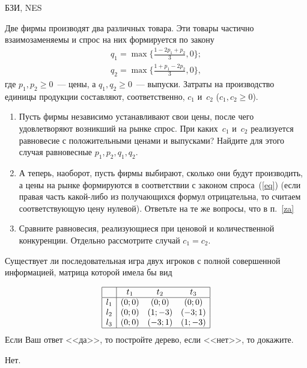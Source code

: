 \begin{problem}
\begin{source}
БЗИ, NES
\end{source} Две
фирмы производят два различных товара. Эти товары частично
взаимозаменяемы и спрос на них формируется по закону
\begin{equation}\label{eq}
\begin{array}{l}
  q_1=\max\biggl\{\frac{1-2p_1+p_2}{3},0\biggr\};\\
  q_2=\max\biggl\{\frac{1+p_1-2p_2}{3},0\biggr\},
\end{array}\end{equation}
где $p_1,p_2\ge 0$~--- цены, а $q_1,q_2\ge 0$~--- выпуски.
Затраты на производство единицы продукции составляют,
соответственно, $c_1$ и~$c_2$ ($c_1,c_2\ge 0$).
\begin{enumerate}
  \item\label{za} Пусть фирмы независимо устанавливают свои цены,
  после чего удовлетворяют возникший на рынке спрос. При каких~$c_1$
  и~$c_2$ реализуется равновесие с положительными ценами и
  выпусками? Найдите для этого случая равновесные $p_1,p_2,q_1,q_2$.
  \item А теперь, наоборот, пусть фирмы выбирают, сколько они
  будут производить, а цены на рынке формируются в соответствии с
  законом спроса~(\ref{eq}) (если правая часть какой-либо из получающихся
  формул отрицательна, то считаем соответствующую цену нулевой).
  Ответьте на те же вопросы, что в п.~\ref{za}
  \item Сравните равновесия, реализующиеся при ценовой и количественной
  конкуренции. Отдельно рассмотрите случай $c_1=c_2$.
\end{enumerate}

\begin{sol}

\end{sol}
\end{problem}

\begin{problem}

Существует ли последовательная игра двух игроков с полной совершенной информацией,
матрица которой имела бы вид\par
\[\begin{array}{|c|ccc|}  \hline {} & {t_{1} } & {t_{2} } & {t_{3} } \\  \hline {l_{1} } & {\left(0;0\right)} & {\left(0;0\right)} & {\left(0;0\right)} \\ {l_{2} } & {\left(0;0\right)} & {\left(1;-3\right)} & {\left(-3;1\right)} \\ {l_{3} } & {\left(0;0\right)} & {\left(-3;1\right)} & {\left(1;-3\right)} \\  \hline  \end{array}\]
Если Ваш ответ <<да>>, то постройте дерево, если <<нет>>, то докажите.



\begin{sol}
Нет.
\end{sol}
\end{problem}






